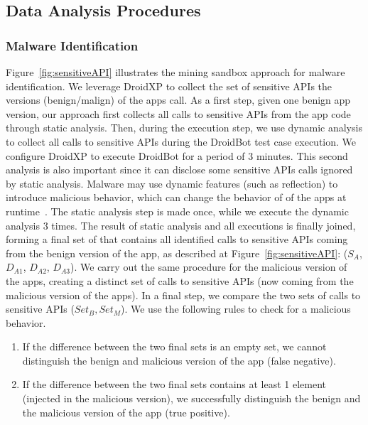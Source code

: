
\subsection{Data Analysis Procedures} \label{sec:dataAnalysisProc}

\subsubsection{Malware Identification} \label{sec:malwaresetup}
Figure~\ref{fig:sensitiveAPI} illustrates the mining sandbox approach for
malware identification. We leverage DroidXP to collect the set of sensitive APIs the versions (benign/malign) of the apps call. As a first step, given one benign app version,
our approach first collects all calls to sensitive APIs from the app code through static analysis. Then, during the execution step,
we use dynamic analysis to collect all calls to sensitive APIs during the DroidBot test case execution. We configure DroidXP to execute DroidBot for a
period of $3$ minutes. This second analysis is also important since it can disclose some sensitive APIs calls ignored by static analysis.
Malware may use dynamic features (such as reflection) to introduce malicious behavior, which can change the behavior of of the apps at runtime~\cite{DBLP:journals/spe/ZhangLTX18,DBLP:journals/tosem/LiTX19}.
The static analysis step is made once, while we execute the dynamic analysis $3$ times. The result of static analysis and all executions is finally joined,
forming a final set of that contains all identified calls to sensitive APIs coming from the benign version of the app, as described at Figure~\ref{fig:sensitiveAPI}: ($S_{A}$, $D_{A1}$, $D_{A2}$, $D_{A3}$). We carry out the same procedure for the malicious version of the apps,
creating a distinct set of calls to sensitive APIs (now coming from the malicious version of the apps). In
a final step, we compare the two sets of calls to sensitive APIs ($Set_B, Set_M$). We use the following rules to
check for a malicious behavior. 

\begin{enumerate}
    \item If the difference between the two final sets is an empty set, we cannot distinguish the benign and malicious version of the app (false negative).
    \item If the difference between the two final sets contains at least 1 element (injected in the malicious version), we successfully distinguish the benign and the malicious version of the app (true positive).
\end{enumerate}

